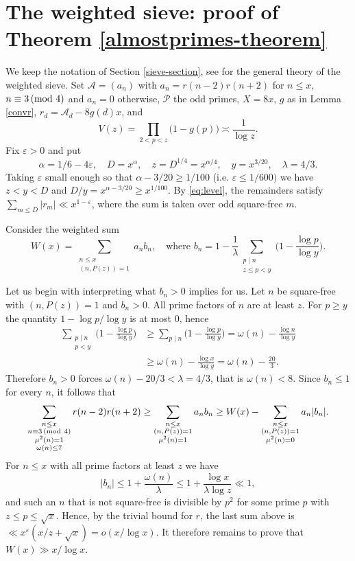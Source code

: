 \documentclass[12pt]{amsart}
\theoremstyle{remark}
\renewcommand{\pmod}[1]{\mkern3mu(\mathrm{mod}\ #1)}
\begin{document}
\section{The weighted sieve: proof of Theorem \ref{almostprimes-theorem}}\label{weighted-section}

We keep the notation of Section \ref{sieve-section}, see
\cite[Chapter 5]{MR1836967} for the general theory of the weighted sieve.
Set $\mathcal{A} = (a_n)$ with $a_n = r(n-2)r(n+2)$ for $n \le x$, $n \equiv 3\pmod 4$ and $a_n = 0$ otherwise, $\mathcal P$ the odd primes, $X = 8x$, $g$ as in Lemma \ref{convr}, $r_d = \mathcal{A}_d - 8g(d)x$, and 
\[
    V(z) = \prod_{2 < p < z}\bigl(1-g(p)\bigr) \asymp \frac{1}{\log z}.
\]
Fix $\varepsilon > 0$ and put
\[
    \alpha = 1/6 - 4\varepsilon, \quad D = x^{\alpha}, \quad z = D^{1/4} = x^{\alpha/4},\quad y = x^{3/20},\quad \lambda = 4/3.
\]
Taking $\varepsilon$ small enough so that $\alpha-3/20 \ge 1/100$ (i.e. $\varepsilon \le 1/600)$ we have $z < y < D$ and $D/y = x^{\alpha-3/20}\ge x^{1/100}$. By \eqref{eq:level}, the remainders satisfy $\sum_{m\le D}|r_m|\ll x^{1-\varepsilon}$, where the sum is taken over odd square-free $m$.

Consider the weighted sum
\[
    W(x) = \sum_{\substack{n\le x\\ (n,P(z))=1}} a_n b_n, \quad\text{where }
b_n=1-\frac1\lambda\sum_{\substack{p\mid n\\ z\le p<y}}\Big(1-\frac{\log p}{\log y}\Big).
\]

Let us begin with interpreting what $b_n >0$ implies for us.
Let $n$ be square-free with $(n,P(z)) = 1$ and $b_n > 0$. All prime factors of $n$ are at least $z$. For $p \ge y$ the quantity $1 - \log p/\log y$ is at most $0$, hence
\[
    \begin{split}
        \sum_{\substack{p\mid n\\ p < y}}\biggl(1-\frac{\log p}{\log y}\biggr) &\ge \sum_{p \mid n}\biggl(1-\frac{\log p}{\log y}\biggr) = \omega(n)-\frac{\log n}{\log y} \\
        &\ge \omega(n) - \frac{\log x}{\log y} = \omega(n)-\frac{20}{3}.
    \end{split}
\]
Therefore $b_n > 0$ forces $\omega(n)-20/3<\lambda = 4/3$, that is $\omega(n) < 8$. Since $b_n\le1$ for every $n$, it follows that
\[
    \sum_{\substack{n\le x \\ n\equiv3 \pmod 4\\ \mu^2(n) = 1 \\ \omega(n) \le 7}} r(n-2)r(n+2) \ge \sum_{\substack{n\le x\\ (n,P(z)) = 1\\ \mu^2(n) = 1}}a_n b_n \ge W(x) -\sum_{\substack{n\le x\\ (n,P(z))=1\\ \mu^2(n) = 0}} a_n|b_n| .
\]
For $n\le x$ with all prime factors at least $z$ we have
\[
    |b_n| \le 1 + \frac{\omega(n)}{\lambda}\le 1 + \frac{\log x}{\lambda\log z}\ll 1,
\]
and such an $n$ that is not square-free is divisible by $p^2$ for some prime $p$ with $z\le p\le\sqrt x$. Hence, by the trivial bound for $r$, the last sum above is $\ll x^{\varepsilon}(x/z+\sqrt x)=o(x/\log x)$. 
It therefore remains to prove that $W(x) \gg x/\log x$.
\end{document}
